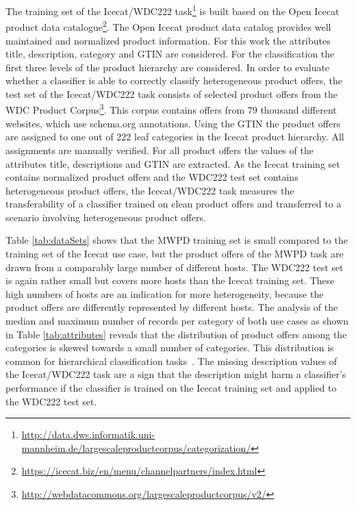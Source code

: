 \documentclass[11pt,dvipdfm]{article}
\begin{document}
The training set of the Icecat/WDC222 task\footnote{\url{http://data.dws.informatik.uni-mannheim.de/largescaleproductcorpus/categorization/}} is built based on the Open Icecat product data catalogue\footnote{\url{https://icecat.biz/en/menu/channelpartners/index.html}}.
The Open Icecat product data catalog provides well maintained and normalized product information.
For this work the attributes title, description, category and \ac{GTIN} are considered.
For the classification the first three levels of the product hierarchy are considered.
In order to evaluate whether a classifier is able to correctly classify heterogeneous product offers, the test set of the Icecat/WDC222 task consists of selected product offers from the \ac{WDC} Product Corpus\footnote{\url{http://webdatacommons.org/largescaleproductcorpus/v2/}}. 
This corpus contains offers from 79 thousand different websites, which use schema.org annotations.
Using the \ac{GTIN} the product offers are assigned to one out of 222 leaf categories in the Icecat product hierarchy.
All assignments are manually verified.
For all product offers the values of the attributes title, descriptions and \ac{GTIN} are extracted.
As the Icecat training set contains normalized product offers and the WDC222 test set contains heterogeneous product offers, the Icecat/WDC222 task measures the transferability of a classifier trained on clean product offers and transferred to a scenario involving heterogeneous product offers.

Table \ref{tab:dataSets} shows that the \ac{MWPD} training set is small compared to the training set of the Icecat use case, but the product offers of the \ac{MWPD} task are drawn from a comparably large number of different hosts.
The WDC222 test set is again rather small but covers more hosts than the Icecat training set.
These high numbers of hosts are an indication for more heterogeneity, because the product offers are differently represented by different hosts.
The analysis of the median and maximum number of records per category of both use cases as shown in Table \ref{tab:attributes} reveals that the distribution of product offers among the categories is skewed towards a small number of categories.
This distribution is common for hierarchical classification tasks~\cite{silla_survey_2011}.
The missing description values of the Icecat/WDC222 task are a sign that the description might harm a classifier's performance if the classifier is trained on the Icecat training set and applied to the WDC222 test set.
\end{document}

